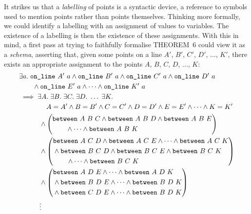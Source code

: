 It strikes us that a \emph{labelling} of points is a syntactic device, a reference to symbols used to mention points rather than points themselves. Thinking more formally, we could identify a labelling with an assignment of values to variables. The existence of a labelling is then the existence of these assignments. With this in mind, a first pass at trying to faithfully formalise THEOREM~6 could view it as a \emph{schema}, asserting that, given some points on a line $A'$, $B'$, $C'$, $D'$, $\ldots$, $K'$, there exists an appropriate assignment to the points $A$, $B$, $C$, $D$, $\ldots$, $K$:
\begin{equation*}
  \begin{split}
    &\exists a.\;\code{on\_line}\ A'\ a\wedge\code{on\_line}\ B'\ a\wedge\code{on\_line}\ C'\ a\wedge\code{on\_line}\ D'\ a\\
    &\qquad\wedge\code{on\_line}\ E'\ a\wedge\cdots\wedge\code{on\_line}\ K'\ a\\
    &\implies\exists A.\;\exists B.\;\exists C.\;\exists D.\; \ldots\;\exists K.\; \\
    &\qquad\qquad A = A' \wedge B = B' \wedge C = C' \wedge D = D' \wedge E = E' \wedge \cdots \wedge K = K'\\
    &\qquad\quad\wedge\left(\begin{split}&\between{A}{B}{C} \wedge \between{A}{B}{D} \wedge \between{A}{B}{E} \\ &\qquad\wedge\cdots \wedge \between{A}{B}{K}\end{split}\right) \\
    &\qquad\quad\wedge
    \left(\begin{split}&\between{A}{C}{D} \wedge \between{A}{C}{E} \wedge \cdots \wedge \between{A}{C}{K}\\
        &\wedge\between{B}{C}{D} \wedge \between{B}{C}{E} \wedge \between{B}{C}{K}\\
        &\qquad\wedge \cdots \wedge \between{B}{C}{K}
      \end{split}\right)\\  
    &\qquad\quad\wedge
    \left(\begin{split}&\between{A}{D}{E} \wedge \cdots \wedge \between{A}{D}{K} \\
        &\wedge\between{B}{D}{E} \wedge \cdots \wedge \between{B}{D}{K} \\
        &\wedge\between{C}{D}{E} \wedge \cdots \wedge \between{B}{D}{K}
        \end{split}\right)\\
    &\qquad\quad\vdots
  \end{split}
\end{equation*}

